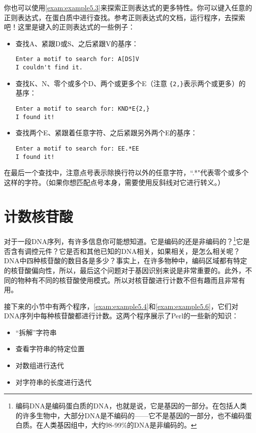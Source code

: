 你也可以使用\autoref{exam:example5.3}来探索正则表达式的更多特性。你可以键入任意的正则表达式，在蛋白质中进行查找。参考正则表达式的文档，运行程序，去探索吧！这里是键入的正则表达式的一些例子：

\begin{itemize}
  \item 查找A、紧跟D或S、之后紧跟V的基序：
\begin{lstlisting}
Enter a motif to search for: A[DS]V
I couldn't find it.
\end{lstlisting}
  \item 查找K、N、零个或多个D、两个或更多个E（注意 \verb|{2,}|表示两个或更多）的基序：
\begin{lstlisting}
Enter a motif to search for: KND*E{2,}
I found it!
\end{lstlisting}
  \item 查找两个E、紧跟着任意字符、之后紧跟另外两个E的基序：
\begin{lstlisting}
Enter a motif to search for: EE.*EE
I found it!
\end{lstlisting}
\end{itemize}

在最后一个查找中，注意点号表示除换行符以外的任意字符，``.*"代表零个或多个这样的字符。（如果你想匹配点号本身，需要使用反斜线对它进行转义。）

\section{计数核苷酸}
对于一段DNA序列，有许多信息你可能想知道。它是编码的还是非编码的？\footnote{编码DNA是编码蛋白质的DNA，也就是说，它是基因的一部分。在包括人类的许多生物中，大部分DNA是不编码的——它不是基因的一部分，也不编码蛋白质。在人类基因组中，大约98-99\%的DNA是非编码的。}它是否含有调控元件？它是否和其他已知的DNA相关，如果相关，是怎么相关呢？DNA中四种核苷酸的数目各是多少？事实上，在许多物种中，编码区域都有特定的核苷酸偏向性，所以，最后这个问题对于基因识别来说是非常重要的。此外，不同的物种有不同的核苷酸使用模式。所以对核苷酸进行计数不但有趣而且非常有用。

接下来的小节中有两个程序，\autoref{exam:example5.4}和\autoref{exam:example5.6}，它们对DNA序列中每种核苷酸都进行计数。这两个程序展示了Perl的一些新的知识：

\begin{itemize}
  \item “拆解”字符串
  \item 查看字符串的特定位置
  \item 对数组进行迭代
  \item 对字符串的长度进行迭代
\end{itemize}

